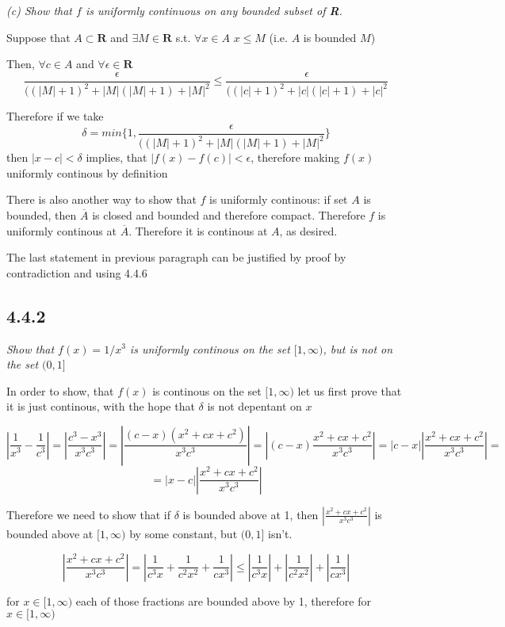 \documentclass[11pt,oneside,titlepage]{book}
\begin{document}
\textit{(c) Show that $f$ is uniformly continuous on any bounded subset
  of \textbf{R}.}

Suppose that $A \subset \textbf{R}$ and $\exists M \in \textbf{R}$ s.t.
$\forall x \in A$ $x \leq M$ (i.e. $A$ is bounded $M$)

Then, $\forall c \in A$ and $\forall \epsilon \in \textbf{R}$
$$\frac{\epsilon}{((|M| + 1)^{2} + |M|(|M| + 1) + |M|^2}  \leq
\frac{\epsilon}{((|c| + 1)^{2} + |c|(|c| + 1) + |c|^2} $$

Therefore if we take
$$\delta = min\{1, \frac{\epsilon}{((|M| + 1)^{2} + |M|(|M| + 1) + |M|^2}\} $$
then $|x - c| < \delta$ implies, that $ |f(x) - f(c)| < \epsilon$, therefore
making $f(x)$ uniformly continous by definition

There is also another way to show that $f$ is uniformly continous:
if set $A$ is bounded, then $\overline A$ is closed and bounded and therefore
compact. Therefore $f$ is uniformly continous at $\overline A$. Therefore
it is continous at $A$, as desired.

The last statement in previous paragraph can be justified by proof by
contradiction and using 4.4.6

\subsection*{4.4.2}
\textit{Show that $f(x) = 1/x^3$  is uniformly continous on the set
  $[1, \infty)$, but is not on the set $(0, 1]$}

In order to show, that $f(x)$ is continous on the set $[1, \infty)$ let us
first prove that it is just continous, with the hope that $\delta$ is not
depentant on $x$

$$ |\frac{1}{x^3} - \frac{1}{c^3}| = |\frac{c^3 - x^3}{x^3c^3}| =
|\frac{(c - x)(x^2 + cx + c^2)}{x^3c^3}|
= |(c - x) \frac{x^2 + cx + c^2}{x^3c^3}| =
|c - x||\frac{x^2 + cx + c^2}{x^3c^3}| =$$
$$ = |x - c||\frac{x^2 + cx + c^2}{x^3c^3}| $$

Therefore we need to show that if $\delta$ is bounded above at 1, then
$|\frac{x^2 + cx + c^2}{x^3c^3}|$ is bounded above at $[1, \infty)$ by
some constant, but  $(0, 1]$ isn't.

$$ |\frac{x^2 + cx + c^2}{x^3c^3}| = |\frac{1}{c^3 x} + \frac{1}{c^2x^2}
+ \frac{1}{cx^3}| \leq
|\frac{1}{c^3 x}| + |\frac{1}{c^2x^2}| + |\frac{1}{cx^3}|
$$

for $x \in [1, \infty)$ each of those fractions are bounded above by 1,
therefore for $x \in [1, \infty)$
\end{document}
